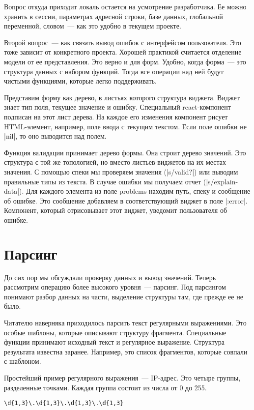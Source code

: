 Вопрос откуда приходит локаль остается на усмотрение разработчика. Ее можно
хранить в сессии, параметрах адресной строки, базе данных, глобальной
переменной, словом~--- как это удобно в текущем проекте.

Второй вопрос~--- как связать вывод ошибок с интерфейсом пользователя. Это тоже
зависит от конкретного проекта. Хорошей практикой считается отделение модели от
ее представления. Это верно и для форм. Удобно, когда форма~--- это структура
данных с набором функций. Тогда все операции над ней будут чистыми функциями,
которые легко поддерживать.

Представим форму как дерево, в листьях которого структура виджета. Виджет знает
тип поля, текущее значение и ошибку. Специальный react-компонент подписан на
этот лист дерева. На каждое его изменения компонент рисует HTML-элемент,
например, поле ввода с текущим текстом. Если поле ошибки не \spverb|nil|, то оно
выводится над полем.

Функция валидации принимает дерево формы. Она строит дерево значений. Это
структура с той же топологией, но вместо листьев-виджетов на их местах
значения. С помощью спеки мы проверяем значения (\spverb|s/valid?|) или выводим
правильные типы из текста. В случае ошибки мы получаем отчет
(\spverb|s/explain-data|). Для каждого элемента из поле problems находим путь, спеку и
сообщение об ошибке. Это сообщение добавляем в соответствующий виджет в поле
\spverb|:error|. Компонент, который отрисовывает этот виджет, уведомит пользователя об
ошибке.

\section{Парсинг}

До сих пор мы обсуждали проверку данных и вывод значений. Теперь рассмотрим
операцию более высокого уровня~--- парсинг. Под парсингом понимают разбор данных
на части, выделение структуры там, где прежде ее не было.

Читателю наверняка приходилось парсить текст регулярными выражениями. Это особые
шаблоны, которые описывают структуру фрагмента. Специальные функции принимают
исходный текст и регулярное выражение. Структура результата известна
заранее. Например, это список фрагментов, которые совпали с шаблоном.

Простейший пример регулярного выражения~--- IP-адрес. Это четыре группы,
разделенные точками. Каждая группа состоит из числа от 0 до 255.

\begin{verbatim}
\d{1,3}\.\d{1,3}\.\d{1,3}\.\d{1,3}
\end{verbatim}

